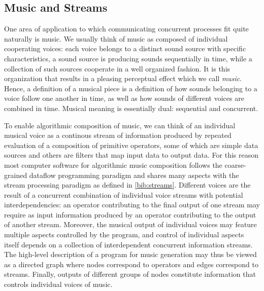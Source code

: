 \documentclass {article}
\begin{document}
\subsection{Music and Streams}

One area of application to which communicating concurrent processes fit quite
naturally is music. We usually think of music as composed of individual
cooperating voices: each voice belongs to a distinct sound source with specific
characteristics, a sound source is producing sounds sequentially in time, while
a collection of such sources cooperate in a well organized fashion. It is this
organization that results in a pleasing perceptual effect which we call
\emph{music}. Hence, a definition of a musical piece is a definition of how
sounds belonging to a voice follow one another in time, as well as how sounds of
different voices are combined in time. Musical meaning is essentially dual:
sequential and concurrent.

To enable algorithmic composition of music, we can think of an individual
musical voice as a continous stream of information produced by repeated
evaluation of a composition of primitive operators, some of which are simple
data sources and others are filters that map input data to output data. For this
reason most computer software for algorithmic music composition follows the
coarse-grained dataflow programming paradigm and shares many aspects with the
stream processing paradigm as defined in \ref{bib:streams}. Different voices are
the result of a concurrent combination of individual voice streams with
potential interdependencies: an operator contributing to the final output of one
stream may require as input information produced by an operator contributing to
the output of another stream. Moreover, the musical output of individual voices
may feature multiple aspects controlled by the program, and control of
individual aspects itself depends on a collection of interdependent concurrent
information streams.
The high-level description of a program for music generation may thus be viewed
as a directed graph where nodes correspond to operators and edges correspond to
streams. Finally, outputs of different groups of nodes constitute information
that controls individual voices of music.
\end{document}
